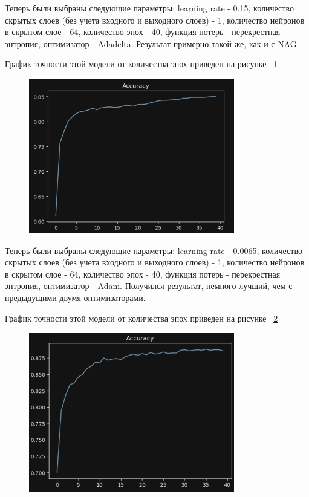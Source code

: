 \documentclass[a4paper, 14pt]{extarticle}
\begin{document}
Теперь были выбраны следующие параметры: learning rate - 0.15, количество скрытых слоев (без учета входного и выходного слоев) - 1, количество нейронов в скрытом слое - 64, количество эпох - 40, функция потерь - перекрестная энтропия, оптимизатор - Adadelta. Результат примерно такой же, как и с NAG.

График точности этой модели от количества эпох приведен на рисунке ~\ref{fig:img3}

\begin{figure}[H]
\centering
\includegraphics[width=0.8\textwidth]{images/res3.png}
\caption{}
\label{fig:img3}
\end{figure}

Теперь были выбраны следующие параметры: learning rate - 0.0065, количество скрытых слоев (без учета входного и выходного слоев) - 1, количество нейронов в скрытом слое - 64, количество эпох - 40, функция потерь - перекрестная энтропия, оптимизатор - Adam. Получился результат, немного лучший, чем с предыдущими двумя оптимизаторами.

График точности этой модели от количества эпох приведен на рисунке ~\ref{fig:img4}

\begin{figure}[H]
\centering
\includegraphics[width=0.8\textwidth]{images/res4.png}
\caption{}
\label{fig:img4}
\end{figure}
\end{document}
